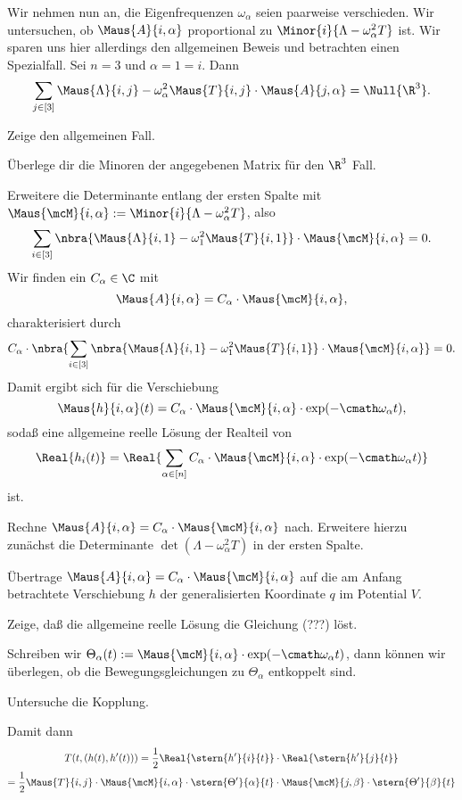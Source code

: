 \documentclass[../WiSe22ANA3.tex]{subfiles}
\begin{document}
		Wir nehmen nun an, die Eigenfrequenzen $\omega_\alpha$ seien paarweise verschieden. Wir untersuchen, ob $\Maus{A}{i,\alpha}$ proportional zu $\Minor{i}{\Lambda-\omega_\alpha^2T}$ ist. Wir sparen uns hier allerdings den allgemeinen Beweis und betrachten einen Spezialfall. Sei $n=3$ und $\alpha=1=i$. Dann 
		$$\sum_{j\in[3]}\Maus{\Lambda}{i,j}-\omega_\alpha^2\Maus{T}{i,j}\cdot\Maus{A}{j,\alpha}=\Null{\R^3}.$$
		\begin{Aufgabe}
			\nr Zeige den allgemeinen Fall. 
			
			\nr Überlege dir die Minoren der angegebenen Matrix für den $\R^3$ Fall. 
		\end{Aufgabe}
		
		Erweitere die Determinante entlang der ersten Spalte mit $\Maus{\mcM}{i,\alpha}:=\Minor{i}{\Lambda-\omega_\alpha^2T}$, also
		$$\sum_{i\in[3]}\nbra{\Maus{\Lambda}{i,1}-\omega_1^2\Maus{T}{i,1}}\cdot\Maus{\mcM}{i,\alpha}=0.$$
		Wir finden ein $C_\alpha\in\C$ mit
		$$\Maus{A}{i,\alpha}=C_\alpha\cdot\Maus{\mcM}{i,\alpha},$$
		charakterisiert durch 
		$$C_\alpha\cdot\nbra{\sum_{i\in[3]}\nbra{\Maus{\Lambda}{i,1}-\omega_1^2\Maus{T}{i,1}}\cdot\Maus{\mcM}{i,\alpha}}=0.$$
		Damit ergibt sich für die Verschiebung
		$$\Maus{h}{i,\alpha}(t)=C_\alpha\cdot\Maus{\mcM}{i,\alpha}\cdot\exp(-\cmath\omega_\alpha t),$$
		sodaß eine allgemeine reelle Lösung der Realteil von 
		$$\Real{h_i(t)}=\Real{\sum_{\alpha\in[n]}C_\alpha\cdot\Maus{\mcM}{i,\alpha}\cdot\exp(-\cmath\omega_\alpha t)}$$
		ist. 
		\begin{Aufgabe}
			\nr Rechne $\Maus{A}{i,\alpha}=C_\alpha\cdot\Maus{\mcM}{i,\alpha}$ nach. Erweitere hierzu zunächst die Determinante $\det(\Lambda-\omega_\alpha^2 T)$ in der ersten Spalte. 
			
			\nr Übertrage $\Maus{A}{i,\alpha}=C_\alpha\cdot\Maus{\mcM}{i,\alpha}$ auf die am Anfang betrachtete Verschiebung $h$ der generalisierten Koordinate $q$ im Potential $V$. 
			
			\nr Zeige, daß die allgemeine reelle Lösung die Gleichung (???) löst. 
		\end{Aufgabe}
		Schreiben wir $\Theta_\alpha(t):=\Maus{\mcM}{i,\alpha}\cdot\exp(-\cmath\omega_\alpha t)$, dann können wir überlegen, ob die Bewegungsgleichungen zu $\Theta_\alpha$ entkoppelt sind.
		\begin{Aufgabe}
			\nr Untersuche die Kopplung. 
		\end{Aufgabe}
		Damit dann 
		\begin{multline*}
			T(t,(h(t),h'(t)))=\frac{1}{2}\Real{\stern{h'}{i}{t}}\cdot\Real{\stern{h'}{j}{t}}\\
			=\frac{1}{2}\Maus{T}{i,j}\cdot\Maus{\mcM}{i,\alpha}\cdot\stern{\Theta'}{\alpha}{t}\cdot\Maus{\mcM}{j,\beta}\cdot\stern{\Theta'}{\beta}{t}
		\end{multline*}
\end{document}
